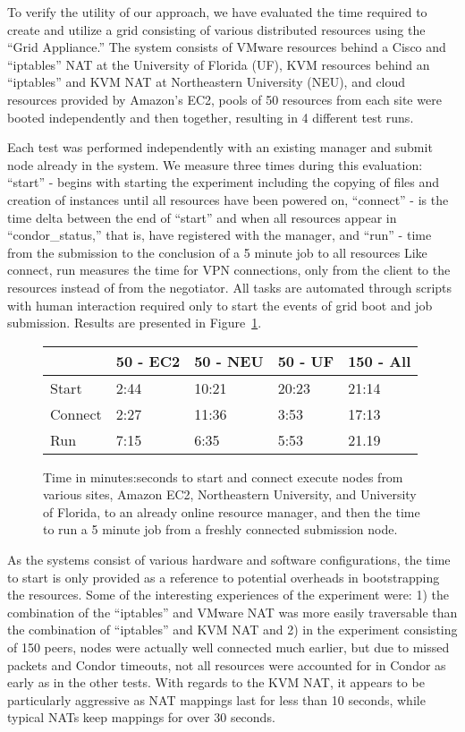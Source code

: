 \documentclass[conference]{IEEEtran}
\begin{document}
To verify the utility of our approach, we have evaluated the time required to
create and utilize a grid consisting of various distributed resources using the
``Grid Appliance.'' The system consists of VMware resources behind a Cisco and
``iptables'' NAT at the University of Florida (UF), KVM resources behind an
``iptables'' and KVM NAT at Northeastern University (NEU), and cloud resources
provided by Amazon's EC2, pools of 50 resources from each site were booted
independently and then together, resulting in 4 different test runs.

Each test was performed independently with an existing manager and submit node
already in the system.  We measure three times during this evaluation:
``start'' - begins with starting the experiment including the copying of files
and creation of instances until all resources have been powered on, ``connect''
- is the time delta between the end of ``start'' and when all resources appear
in ``condor\_status,'' that is, have registered with the manager, and ``run'' -
time from the submission to the conclusion of a 5 minute job to all resources
Like connect, run measures the time for VPN connections, only from the client
to the resources instead of from the negotiator.  All tasks are automated
through scripts with human interaction required only to start the events of
grid boot and job submission.  Results are presented in
Figure~\ref{fig:results}.

\begin{figure}[ht]
\small{
\setlength{\itemsep}{0pt}
\setlength{\parskip}{0pt}
\centering
\begin{tabular}[c]{|m{1.0cm}||m{1.2cm}|m{1.3cm}|m{1.2cm}|m{1.2cm}|} \hline
& 50 - EC2 & 50 - NEU & 50 - UF & 150 - All \\ \hline\hline
Start & 2:44 & 10:21 & 20:23 & 21:14 \\ \hline
Connect & 2:27 & 11:36 & 3:53 & 17:13\\ \hline
Run & 7:15 & 6:35 & 5:53 & 21.19 \\ \hline
\end{tabular}
\caption{\small{Time in minutes:seconds to start and connect execute nodes from
various sites, Amazon EC2, Northeastern University, and University of Florida,
to an already online resource manager, and then the time to run a 5 minute job
from a freshly connected submission node.}}
\label{fig:results}
}
\end{figure}

As the systems consist of various hardware and software configurations, the
time to start is only provided as a reference to potential overheads in
bootstrapping the resources.  Some of the interesting experiences of the
experiment were:  1) the combination of the ``iptables'' and VMware NAT was
more easily traversable than the combination of ``iptables'' and KVM NAT and 2)
in the experiment consisting of 150 peers, nodes were actually well connected
much earlier, but due to missed packets and Condor timeouts, not all resources
were accounted for in Condor as early as in the other tests.  With regards to
the KVM NAT, it appears to be particularly aggressive as NAT mappings last for
less than 10 seconds, while typical NATs keep mappings for over 30 seconds.
\end{document}
